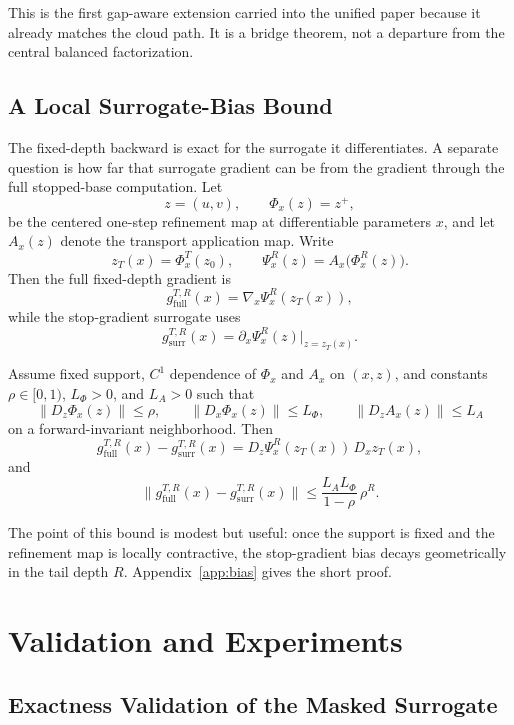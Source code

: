 This is the first gap-aware extension carried into the unified paper because it already matches the cloud path. It is a bridge theorem, not a departure from the central balanced factorization.

\subsection{A Local Surrogate-Bias Bound}

The fixed-depth backward is exact for the surrogate it differentiates. A separate question is how far that surrogate gradient can be from the gradient through the full stopped-base computation. Let
\[
z=(u,v),\qquad \Phi_x(z)=z^+,
\]
be the centered one-step refinement map at differentiable parameters $x$, and let $A_x(z)$ denote the transport application map. Write
\[
z_T(x)=\Phi_x^T(z_0),
\qquad
\Psi_x^R(z)=A_x\!\bigl(\Phi_x^R(z)\bigr).
\]
Then the full fixed-depth gradient is
\[
g_{\mathrm{full}}^{T,R}(x)=\nabla_x \Psi_x^R(z_T(x)),
\]
while the stop-gradient surrogate uses
\[
g_{\mathrm{surr}}^{T,R}(x)=\partial_x \Psi_x^R(z)\big|_{z=z_T(x)}.
\]

\begin{theorem}\label{thm:surrogate_bias}
Assume fixed support, $C^1$ dependence of $\Phi_x$ and $A_x$ on $(x,z)$, and constants $\rho\in[0,1)$, $L_\Phi>0$, and $L_A>0$ such that
\[
\|D_z\Phi_x(z)\|\le\rho,
\qquad
\|D_x\Phi_x(z)\|\le L_\Phi,
\qquad
\|D_z A_x(z)\|\le L_A
\]
on a forward-invariant neighborhood. Then
\[
g_{\mathrm{full}}^{T,R}(x)-g_{\mathrm{surr}}^{T,R}(x)
=
D_z\Psi_x^R(z_T(x))\,D_x z_T(x),
\]
and
\[
\bigl\|g_{\mathrm{full}}^{T,R}(x)-g_{\mathrm{surr}}^{T,R}(x)\bigr\|
\le
\frac{L_A L_\Phi}{1-\rho}\,\rho^R.
\]
\end{theorem}

The point of this bound is modest but useful: once the support is fixed and the refinement map is locally contractive, the stop-gradient bias decays geometrically in the tail depth $R$. Appendix~\ref{app:bias} gives the short proof.

\section{Validation and Experiments}

\subsection{Exactness Validation of the Masked Surrogate}

